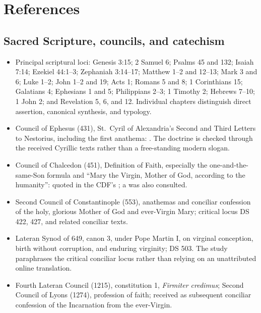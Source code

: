 \section{References}

\begingroup
\footnotesize
\setlength{\parskip}{0.25em}

\subsection{Sacred Scripture, councils, and catechism}

\begin{itemize}
  \item Principal scriptural loci: Genesis 3:15; 2 Samuel 6; Psalms 45 and 132; Isaiah 7:14; Ezekiel 44:1--3; Zephaniah 3:14--17; Matthew 1--2 and 12--13; Mark 3 and 6; Luke 1--2; John 1--2 and 19; Acts 1; Romans 5 and 8; 1 Corinthians 15; Galatians 4; Ephesians 1 and 5; Philippians 2--3; 1 Timothy 2; Hebrews 7--10; 1 John 2; and Revelation 5, 6, and 12. Individual chapters distinguish direct assertion, canonical synthesis, and typology.
  \item Council of Ephesus (431), St.~Cyril of Alexandria's Second and Third Letters to Nestorius, including the first anathema: . The doctrine is checked through the received Cyrillic texts rather than a free-standing modern slogan.
  \item Council of Chalcedon (451), Definition of Faith, especially the one-and-the-same-Son formula and ``Mary the Virgin, Mother of God, according to the humanity'': quoted in the CDF's ; a  was also consulted.
  \item Second Council of Constantinople (553), anathemas and conciliar confession of the holy, glorious Mother of God and ever-Virgin Mary; critical locus DS 422, 427, and related conciliar texts.
  \item Lateran Synod of 649, canon 3, under Pope Martin I, on virginal conception, birth without corruption, and enduring virginity; DS 503. The study paraphrases the critical conciliar locus rather than relying on an unattributed online translation.
  \item Fourth Lateran Council (1215), constitution 1, \emph{Firmiter credimus}; Second Council of Lyons (1274), profession of faith; received as subsequent conciliar confession of the Incarnation from the ever-Virgin.

\end{itemize}
